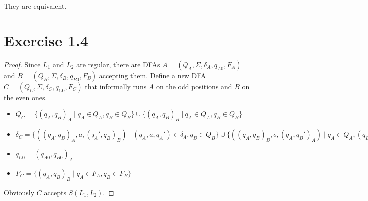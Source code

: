 \documentclass[10pt,a4paper]{article}
\begin{document}
They are equivalent.

\section*{Exercise 1.4}

\begin{proof}
  Since $L_{1}$ and $L_{2}$ are regular, there are DFAs $A = (Q_{A}, \Sigma, \delta_{A}, q_{A0}, F_{A})$ and $B = (Q_{B}, \Sigma, \delta_{B}, q_{B0}, F_{B})$ accepting them.
  Define a new DFA $C = (Q_{C}, \Sigma, \delta_{C}, q_{C0}, F_{C})$ that informally runs $A$ on the odd positions and $B$ on the even ones.
  \begin{itemize}
  \item $Q_{C} = \{ (q_{A}, q_{B})_{A} \mid q_{A} \in Q_{A}, q_{B} \in Q_{B} \} \cup \{ (q_{A}, q_{B})_{B} \mid q_{A} \in Q_{A}, q_{B} \in Q_{B} \}$
  \item $\delta_{C} = \{ ((q_{A}, q_{B})_{A}, a, (q_{A}', q_{B})_{B}) \mid (q_{A}, a, q_{A}') \in \delta_{A}, q_{B} \in Q_{B} \} \cup \{ ((q_{A}, q_{B})_{B}, a, (q_{A}, q_{B}')_{A}) \mid q_{A} \in Q_{A}, (q_{B}, a, q_{B}') \in \delta_{B} \}$
  \item $q_{C0} = (q_{A0}, q_{B0})_{A}$
  \item $F_{C} = \{ (q_{A}, q_{B})_{B} \mid q_{A} \in F_{A}, q_{B} \in F_{B} \}$
  \end{itemize}
  Obviously $C$ accepts $S(L_{1}, L_{2})$.
\end{proof}
\end{document}
